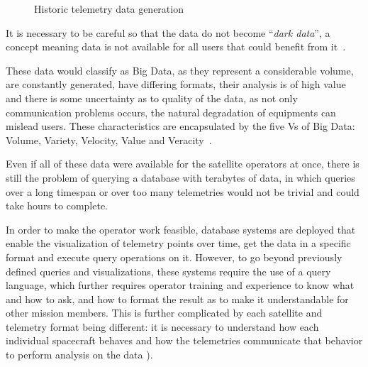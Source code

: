 \begin{figure}[!hb]
  \caption{Historic telemetry data generation}\label{fig:totaldatagen}
  \vspace{4mm}
  \begin{center}
  \end{center}
  \vspace{2mm}
\end{figure}

It is necessary to be careful so that the data do not become ``\textit{dark data}'', a concept meaning data is not available for all users that could benefit from it~\cite{heidornSheddingLightDark2008}.

These data would classify as Big Data, as they represent a considerable volume, are constantly generated, have differing formats, their analysis is of high value and there is some uncertainty as to quality of the data, as not only communication problems occurs, the natural degradation of equipments can mislead users.
These characteristics are encapsulated by the five Vs of Big Data: Volume, Variety, Velocity, Value and Veracity~\cite{kacfahemaniUnderstandableBigData2015}.

Even if all of these data were available for the satellite operators at once, there is still the problem of querying a database with terabytes of data, in which queries over a long timespan or over too many telemetries would not be trivial and could take hours to complete.

In order to make the operator work feasible, database systems are deployed that enable the visualization of telemetry points over time, get the data in a specific format and execute query operations on it.
However, to go beyond previously defined queries and visualizations, these systems require the use of a query language, which further requires operator training and experience to know what and how to ask, and how to format the result as to make it understandable for other mission members.
This is further complicated by each satellite and telemetry format being different: it is necessary to understand how each individual spacecraft behaves and how the telemetries communicate that behavior to perform analysis on the data \cite{uhligSpacecraftOperations2015}).

